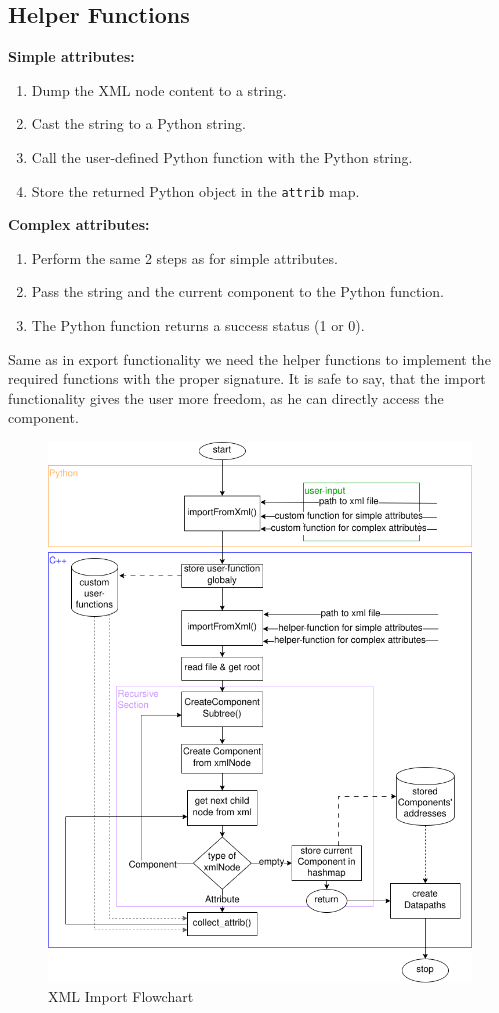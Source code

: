 \subsection{Helper Functions}
\textbf{Simple attributes:}
    \begin{enumerate}
        \item Dump the XML node content to a string.
        \item Cast the string to a Python string.
        \item Call the user-defined Python function with the Python string.
        \item Store the returned Python object in the \verb|attrib| map.
    \end{enumerate}
    \textbf{Complex attributes:}
    \begin{enumerate}
        \item Perform the same 2 steps as for simple attributes.
        \item Pass the string and the current component to the Python function.
        \item The Python function returns a success status (1 or 0).
    \end{enumerate}

Same as in export functionality we need the helper functions to implement the required functions with the proper signature. It is safe to say, that the import functionality gives the user more freedom, as he can directly access the component. 

\begin{figure}[htpb]
    \centering
    \includegraphics[width=\textwidth]{figures/XML_import-flowchart.png}
    \caption{XML Import Flowchart}
    \label{fig:xml-import}
\end{figure}

